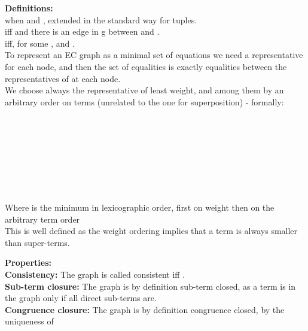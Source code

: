 \textbf{Definitions:}\\
 when  and , extended in the standard way for tuples.\\
 iff  and there is an edge in g between  and .\\
 iff, for some ,  and .\\
To represent an EC graph as a minimal set of equations we need a representative \gfa for each node, 
and then the set of equalities is exactly equalities between the representatives of \gfas at each node.\\
We choose always the representative of least weight, and among them by an arbitrary order on terms (unrelated to the one for superposition) - formally:\\
\\
\\
\\
\\
\\
 \\
 \\
\\
Where  is the minimum in lexicographic order, first on weight then on the arbitrary term order\\
This is well defined as the weight ordering implies that a term is always smaller than super-terms.

\bigskip
\noindent
\textbf{Properties:}\\
\textbf{Consistency:} The graph is called consistent iff .\\
\textbf{Sub-term closure:} The graph is by definition sub-term closed, as a term is in the graph only if all direct sub-terms are.\\
\textbf{Congruence closure:} The graph is by definition congruence closed, by the uniqueness of 

